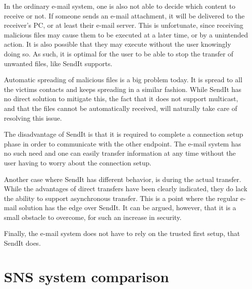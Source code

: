 	In the ordinary e-mail system, one is also not able to decide which content to receive or not. If someone sends an e-mail attachment, it will be delivered to the receiver's PC, or at least their e-mail server. This is unfortunate, since receiving malicious files may cause them to be executed at a later time, or by a unintended action. It is also possible that they may execute without the user knowingly doing so. As such, it is optimal for the user to be able to stop the transfer of unwanted files, like SendIt supports.

	Automatic spreading of malicious files is a big problem today. It is spread to all the victims contacts and keeps spreading in a similar fashion. While SendIt has no direct solution to mitigate this, the fact that it does not support multicast, and that the files cannot be automatically received, will naturally take care of resolving this issue.

	The disadvantage of SendIt is that it is required to complete a connection setup phase in order to communicate with the other endpoint. The e-mail system has no such need and one can easily transfer information at any time without the user having to worry about the connection setup.

	Another case where SendIt has different behavior, is during the actual transfer. While the advantages of direct transfers have been clearly indicated, they do lack the ability to support asynchronous transfer. This is a point where the regular e-mail solution has the edge over SendIt. It can be argued, however, that it is a small obstacle to overcome, for such an increase in security.

	Finally, the e-mail system does not have to rely on the trusted first setup, that SendIt does. 

\section{SNS system comparison}







